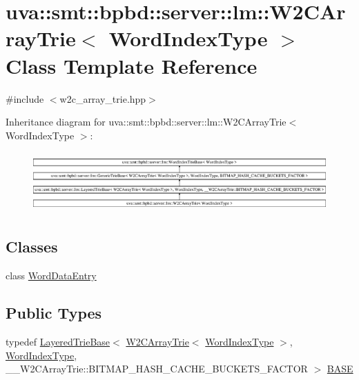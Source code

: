 \hypertarget{classuva_1_1smt_1_1bpbd_1_1server_1_1lm_1_1_w2_c_array_trie}{}\section{uva\+:\+:smt\+:\+:bpbd\+:\+:server\+:\+:lm\+:\+:W2\+C\+Array\+Trie$<$ Word\+Index\+Type $>$ Class Template Reference}
\label{classuva_1_1smt_1_1bpbd_1_1server_1_1lm_1_1_w2_c_array_trie}


{\ttfamily \#include $<$w2c\+\_\+array\+\_\+trie.\+hpp$>$}

Inheritance diagram for uva\+:\+:smt\+:\+:bpbd\+:\+:server\+:\+:lm\+:\+:W2\+C\+Array\+Trie$<$ Word\+Index\+Type $>$\+:\begin{figure}[H]
\begin{center}
\leavevmode
\includegraphics[height=2.360379cm]{classuva_1_1smt_1_1bpbd_1_1server_1_1lm_1_1_w2_c_array_trie}
\end{center}
\end{figure}
\subsection*{Classes}
\begin{DoxyCompactItemize}
\item 
class \hyperlink{classuva_1_1smt_1_1bpbd_1_1server_1_1lm_1_1_w2_c_array_trie_1_1_word_data_entry}{Word\+Data\+Entry}
\end{DoxyCompactItemize}
\subsection*{Public Types}
\begin{DoxyCompactItemize}
\item 
typedef \hyperlink{classuva_1_1smt_1_1bpbd_1_1server_1_1lm_1_1_layered_trie_base}{Layered\+Trie\+Base}$<$ \hyperlink{classuva_1_1smt_1_1bpbd_1_1server_1_1lm_1_1_w2_c_array_trie}{W2\+C\+Array\+Trie}$<$ \hyperlink{classuva_1_1smt_1_1bpbd_1_1server_1_1lm_1_1_word_index_trie_base_a77ee32bf3a9f8a89558bda4f2031200c}{Word\+Index\+Type} $>$, \hyperlink{classuva_1_1smt_1_1bpbd_1_1server_1_1lm_1_1_word_index_trie_base_a77ee32bf3a9f8a89558bda4f2031200c}{Word\+Index\+Type}, \+\_\+\+\_\+\+W2\+C\+Array\+Trie\+::\+B\+I\+T\+M\+A\+P\+\_\+\+H\+A\+S\+H\+\_\+\+C\+A\+C\+H\+E\+\_\+\+B\+U\+C\+K\+E\+T\+S\+\_\+\+F\+A\+C\+T\+O\+R $>$ \hyperlink{classuva_1_1smt_1_1bpbd_1_1server_1_1lm_1_1_w2_c_array_trie_ad13c0f47859d030152254340a71d26b8}{B\+A\+S\+E}
\end{DoxyCompactItemize}

